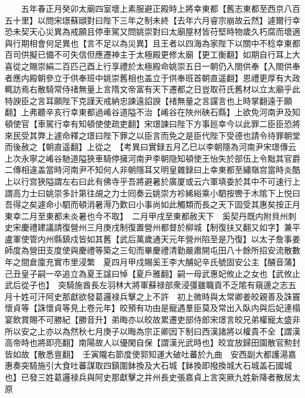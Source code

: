　　五年春正月癸卯太廟四室壞上素服避正殿時上將幸東都【舊志東都至西京八百五十里】以問宋璟蘇頲對曰陛下三年之制未終【去年六月睿宗崩故云然】遽爾行幸恐未契天心災異為戒願且停車駕又問姚崇對曰太廟屋材皆苻堅時物歲久朽腐而壞適與行期相會何足異也【言不足以為災異】且王者以四海為家陛下以關中不稔幸東都百司供擬已備不可失信但應遷神主于太極殿更修太廟【更工衡翻】如期自行耳上大喜從之賜崇絹二百匹己酉上行享禮於太極殿命姚崇五日一朝仍入閤供奉【入閤供奉者應内殿朝參立于供奉班中姚崇舊相也盖立于供奉班首朝直遥翻】恩禮更厚有大政輒訪焉右散騎常侍禇無量上言隋文帝富有天下遷都之日豈取苻氏舊材以立太廟乎此特諛臣之言耳願陛下克謹天戒納忠諫遠諂諛【禇無量之言讜言也上時掌翻遠于願翻】上弗聽辛亥行幸東都過崤谷道隘不治【崤谷在陜州硤石縣】上欲免河南尹及知頓使官【車駕行幸有知頓使使疏吏翻】宋璟諫曰陛下方事廵幸今以此罪二臣臣恐將來民受其弊上遽命釋之璟曰陛下罪之以臣言而免之是臣代陛下受德也請令待罪朝堂而後赦之【朝直遥翻】上從之　【考異曰實録五月乙巳以李朝隱為河南尹宋璟傳云上次永寧之崤谷馳道隘狹車騎停擁河南尹李朝隐知頓使王怡失於部伍上令黜其官爵二傳相違盖當時河南尹不知何人非朝隱耳又明皇雜録曰上幸東都至繡嶺宫當時炎酷上以行宫狹隘謂左右曰此有佛寺乎吾將避暑於廣厦或云六軍填委於其中不可速行上謂高力士曰姚崇多計第往覘之力士囘奏云姚崇方袗絺綌乘小駟按轡于木隂下上悦曰吾得之矣遽命小駟而頓消暑溽乃歎曰小事尚如此觸類而長之天下固受其惠矣按正月東幸二月至東都未炎暑也今不取】　二月甲戌至東都赦天下　奚契丹既内附貝州刺史宋慶禮建議請復營州三月庚戌制復置營州都督於柳城【制復扶又翻又如字】兼平盧軍使管内州縣鎮戍皆如其舊【武后萬歲通天元年營州陷至是乃復】以太子詹事姜師度為營田支度使與慶禮等築之三旬而畢慶禮清勤嚴肅開屯田八十餘所招安流散數年之間倉廩充實市里浸繁　夏四月甲戍賜奚王李大酺妃辛氏號固安公主【酺音蒲】　己丑皇子嗣一卒追立為夏王諡曰悼【夏戶雅翻】嗣一母武惠妃攸止之女也【武攸止武后從子也】　突騎施酋長左羽林大將軍蘇禄部衆浸彊雖職貢不乏隂有窺邊之志五月十姓可汗阿史那獻欲發葛邏禄兵擊之上不許　初上微時與太常卿姜皎親善及誅竇懷貞等【誅懷貞等見上卷元年】皎預有功由是寵遇羣臣莫及常出入臥内與后妃連榻宴飲賞賜不可勝紀【勝音升】弟晦亦以皎故累遷吏部侍郎宋璟言皎兄弟權寵太盛非所以安之上亦以為然秋七月庚子以晦為宗正卿因下制曰西漢諸將以權貴不全【謂漢高帝時也將即亮翻】南陽故人以優閑自保【謂漢光武時也】皎宜放歸田園散官勲封皆如故【散悉亶翻】　壬寅隴右節度使郭知運大破吐蕃於九曲　安西副大都護湯嘉惠奏突騎施引大食吐蕃謀取四鎮圍鉢換及大石城【鉢換即撥換城大石城盖石國城也】已發三姓葛邏禄兵與阿史那獻擊之并州長史張嘉貞上言突厥九姓新降者散居太原

